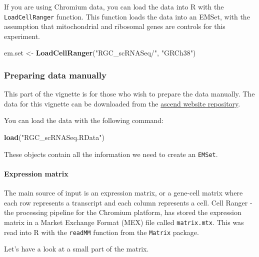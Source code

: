 \documentclass[]{article}
\newenvironment{Shaded}{\begin{snugshade}}{\end{snugshade}}
\newcommand{\KeywordTok}[1]{\textcolor[rgb]{0.13,0.29,0.53}{\textbf{#1}}}
\newcommand{\NormalTok}[1]{#1}
\newcommand{\StringTok}[1]{\textcolor[rgb]{0.31,0.60,0.02}{#1}}
\let\oldparagraph\paragraph
\renewcommand{\paragraph}[1]{\oldparagraph{#1}\mbox{}}
\begin{document}
If you are using Chromium data, you can load the data into R with the
\texttt{LoadCellRanger} function. This function loads the data into an
EMSet, with the assumption that mitochondrial and ribosomal genes are
controls for this experiment.

\begin{Shaded}
\begin{Highlighting}[]
\NormalTok{em.set <-}\StringTok{ }\KeywordTok{LoadCellRanger}\NormalTok{(}\StringTok{"RGC_scRNASeq/"}\NormalTok{, }\StringTok{"GRCh38"}\NormalTok{)}
\end{Highlighting}
\end{Shaded}

\hypertarget{preparing-data-manually}{%
\subsubsection{Preparing data manually}\label{preparing-data-manually}}

This part of the vignette is for those who wish to prepare the data
manually. The data for this vignette can be downloaded from the
\href{https://github.com/IMB-Computational-Genomics-Lab/ascend-guide}{ascend
website repository}.

You can load the data with the following command:

\begin{Shaded}
\begin{Highlighting}[]
\KeywordTok{load}\NormalTok{(}\StringTok{"RGC_scRNASeq.RData"}\NormalTok{)}
\end{Highlighting}
\end{Shaded}

These objects contain all the information we need to create an
\texttt{EMSet}.

\hypertarget{expression-matrix}{%
\paragraph{Expression matrix}\label{expression-matrix}}

The main source of input is an expression matrix, or a gene-cell matrix
where each row represents a transcript and each column represents a
cell. Cell Ranger - the processing pipeline for the Chromium platform,
has stored the expression matrix in a Market Exchange Format (MEX) file
called \texttt{matrix.mtx}. This was read into R with the
\texttt{readMM} function from the \texttt{Matrix} package.

Let's have a look at a small part of the matrix.
\end{document}
